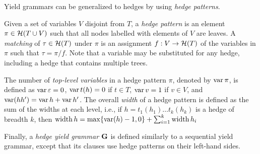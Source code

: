 Yield grammars can be generalized to hedges by using \emph{hedge patterns}.

\begin{definition}
    Given a set of variables \(V\) disjoint from \(T\), a \emph{hedge pattern} is an element \(\pi \in \hedges(T \cup V)\) such that all nodes labelled with elements of \(V\) are leaves.
    A \emph{matching} of \(\tau \in \hedges(T)\) under \(\pi\) is an assignment \(f : V \rightarrow \hedges(T)\) of the variables in \(\pi\) such that \(\tau = \pi/f\).
    Note that a variable may be substituted for any hedge, including a hedge that contains multiple trees.

    The number of \emph{top-level variables} in a hedge pattern \(\pi\), denoted by \(\var\pi\), is defined as \(\var\varepsilon = 0\), \(\var{t(h)} = 0\) if \(t \in T\), \(\var{v} = 1\) if \(v \in V\), and \(\var(hh') = \var h + \var h'\).
    The overall \emph{width} of a hedge pattern is defined as the sum of the widths at each level, i.e.,
    if \(h = t_1(h_1) \ldots t_k(h_k)\) is a hedge of breadth \(k\),
    then \(\width{h} = \max\{\var(h)-1,0\} + \sum_{i=1}^k\width{h_i}\)

    Finally, a \emph{hedge yield grammar} \(\gram\) is defined similarly to a sequential yield grammar, except that its clauses use hedge patterns on their left-hand sides.
\end{definition}

